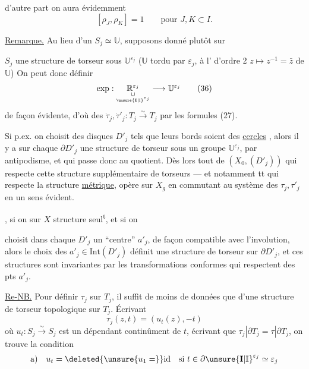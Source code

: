 d'autre part on aura évidemment
\[
[\rho_J,\rho_K]=1\qquad\text{pour }J,K\subset I.
\tag{33}
\]

\uline{Remarque.} Au lieu d'un  $S_j\simeq\mathbb U$,
supposons donné plutôt sur

$S_j$ une structure de torseur sous $\mathbb U^{\varepsilon_j}$
($\mathbb U$ tordu par $\varepsilon_j$,  à l' d'ordre 2
$z\longmapsto z^{-1}=\bar z$ de $\mathbb U$) On peut donc définir
\[
\exp:\underset{\underset{\unsure{\mathbf I|\mathbb I}^{\varepsilon_j}}{\cup}}{\mathbb R^{\varepsilon_j}}
\longrightarrow\mathbb U^{\varepsilon_j}
\tag{36}
\]
de façon évidente, d'où des 
$\dot\tau_j,\dot\tau'_j:T_j\xrightarrow{\sim}T_j$ par les formules (27).

Si p.ex. on choisit des disques $D'_j$ tels que leurs bords soient des \uline{cercles}
, alors il y a sur chaque  $\partial D'_j$
une structure de torseur sous un groupe $\mathbb U^{\varepsilon_j}$,
 par antipodisme, et qui passe donc au quotient.
Dès lors tout  de $(X_0,(D'_j))$ qui respecte cette
structure supplémentaire de torseurs --- et notamment tt  qui respecte
la structure \uline{métrique},  opère sur $X_g$ en commutant
au système des $\tau_j,\tau'_j$ en un sens évident.

, si on   sur $X$
 structure \uline{} seul\textsuperscript{t}, et si on

choisit dans chaque $D'_j$ un ``centre'' $a'_j$, de façon compatible avec l'involution,
alors le choix des $a'_j\in\mathrm{Int}(D'_j)$ définit une structure de torseur sur
$\partial D'_j$\unsure{\textsuperscript{*}}, et ces structures sont invariantes par les
transformations conformes qui respectent  des pts $a'_j$.


\uline{Re-NB.} Pour définir $\tau_j$ sur $T_j$, il suffit de 
moins de données que d'une structure de torseur topologique sur $T_j$.
Écrivant 
\[
\tau_j(z,t)=(u_t(z),-t)
\tag{37}
\]
où $u_t:S_j\xrightarrow{\sim}S_j$ est un  dépendant continûment de $t$,
écrivant que $\tau_j|\partial T_j=\tau|\partial T_j$, on trouve la condition
\[
\text{a)}\quad u_t=\deleted{\unsure{u_1=}}\mathrm{id}
\quad\text{si }t\in\partial\unsure{\mathbf I|\mathbb I}^{\varepsilon_j}\simeq\varepsilon_j
\]

